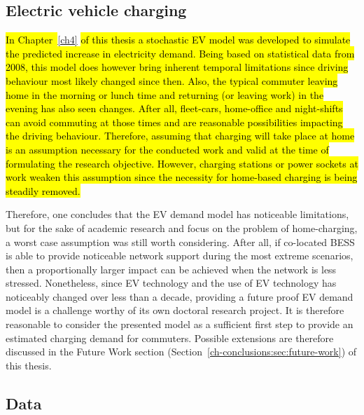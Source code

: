 \subsection{Electric vehicle charging}

\hl{In Chapter~}\ref{ch4}\hl{ of this thesis a stochastic EV model was developed to simulate the predicted increase in electricity demand.
Being based on statistical data from 2008, this model does however bring inherent temporal limitations since driving behaviour most likely changed since then.
Also, the typical commuter leaving home in the morning or lunch time and returning (or leaving work) in the evening has also seen changes.
After all, fleet-cars, home-office and night-shifts can avoid commuting at those times and are reasonable possibilities impacting the driving behaviour.
Therefore, assuming that charging will take place at home is an assumption necessary for the conducted work and valid at the time of formulating the research objective.
However, charging stations or power sockets at work weaken this assumption since the necessity for home-based charging is being steadily removed.}

Therefore, one concludes that the EV demand model has noticeable limitations, but for the sake of academic research and focus on the problem of home-charging, a worst case assumption was still worth considering.
After all, if co-located BESS is able to provide noticeable network support during the most extreme scenarios, then a proportionally larger impact can be achieved when the network is less stressed.
Nonetheless, since EV technology and the use of EV technology has noticeably changed over less than a decade, providing a future proof EV demand model is a challenge worthy of its own doctoral research project.
It is therefore reasonable to consider the presented model as a sufficient first step to provide an estimated charging demand for commuters.
Possible extensions are therefore discussed in the Future Work section (Section~\ref{ch-conclusions:sec:future-work}) of this thesis.

\subsection{Data}

